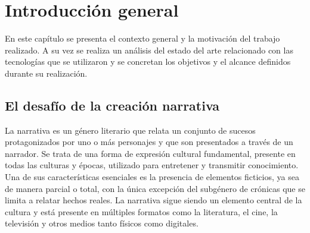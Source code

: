 
\chapter{Introducción general} %

\label{Chapter1} %
\label{IntroGeneral}

En este capítulo se presenta el contexto general y la motivación del trabajo realizado.
A su vez se realiza un análisis del estado del arte relacionado con las tecnologías que se utilizaron
y se concretan los objetivos y el alcance definidos durante su realización.

\newcommand{\keyword}[1]{\textbf{#1}}
\newcommand{\tabhead}[1]{\textbf{#1}}
\newcommand{\code}[1]{\texttt{#1}}
\newcommand{\file}[1]{\texttt{\bfseries#1}}
\newcommand{\option}[1]{\texttt{\itshape#1}}
\newcommand{\grados}{$^{\circ}$}



\section{El desafío de la creación narrativa}

La narrativa es un género literario que relata un conjunto de sucesos
protagonizados por uno o más personajes y que son presentados a través de un narrador.
Se trata de una forma de expresión cultural fundamental, presente en todas las culturas y épocas,
utilizado para entretener y transmitir conocimiento.
Una de sus características esenciales es la presencia de elementos ficticios, ya sea de manera parcial o total,
con la única excepción del subgénero de crónicas que se limita a relatar hechos reales.
La narrativa sigue siendo un elemento central de la cultura y está
presente en múltiples formatos como la literatura, el cine, la televisión y otros medios tanto físicos como digitales.

